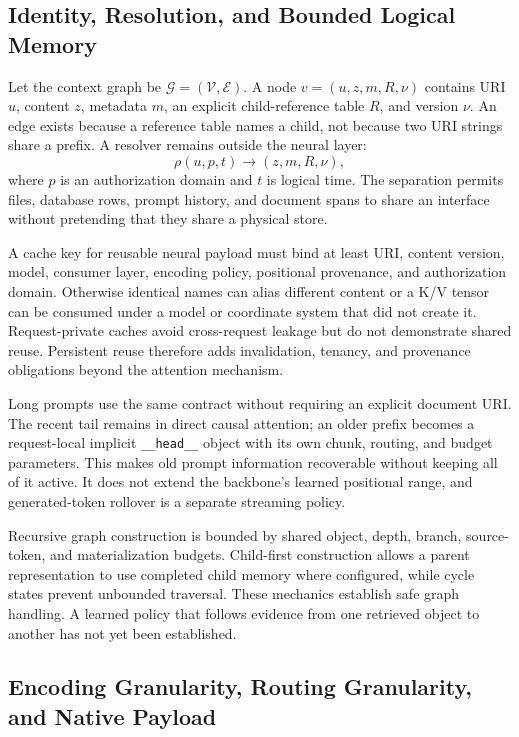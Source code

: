 \subsection{Identity, Resolution, and Bounded Logical Memory}

Let the context graph be $\mathcal G=(\mathcal V,\mathcal E)$. A node
$v=(u,z,m,R,\nu)$ contains URI $u$, content $z$, metadata $m$, an explicit child-reference
table $R$, and version $\nu$. An edge exists because a reference table names a child, not
because two URI strings share a prefix. A resolver remains outside the neural layer:
\begin{equation}
\rho(u,p,t)\longrightarrow(z,m,R,\nu),
\end{equation}
where $p$ is an authorization domain and $t$ is logical time. The separation permits files,
database rows, prompt history, and document spans to share an interface without pretending
that they share a physical store.

A cache key for reusable neural payload must bind at least URI, content version, model,
consumer layer, encoding policy, positional provenance, and authorization domain. Otherwise
identical names can alias different content or a K/V tensor can be consumed under a model or
coordinate system that did not create it. Request-private caches avoid cross-request leakage
but do not demonstrate shared reuse. Persistent reuse therefore adds invalidation, tenancy,
and provenance obligations beyond the attention mechanism.

Long prompts use the same contract without requiring an explicit document URI. The recent
tail remains in direct causal attention; an older prefix becomes a request-local implicit
\texttt{\_\_head\_\_} object with its own chunk, routing, and budget parameters. This makes
old prompt information recoverable without keeping all of it active. It does not extend the
backbone's learned positional range, and generated-token rollover is a separate streaming
policy.

Recursive graph construction is bounded by shared object, depth, branch, source-token, and
materialization budgets. Child-first construction allows a parent representation to use
completed child memory where configured, while cycle states prevent unbounded traversal.
These mechanics establish safe graph handling. A learned policy that follows evidence from
one retrieved object to another has not yet been established.

\subsection{Encoding Granularity, Routing Granularity, and Native Payload}

